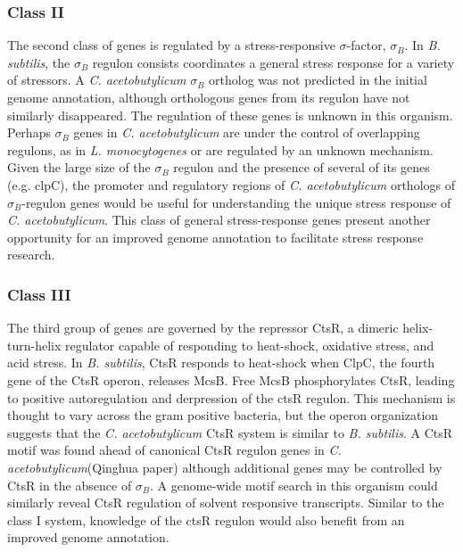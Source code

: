 \subsubsection{Class II}
The second class of genes is regulated by a stress-responsive $\sigma$-factor, $\sigma_{B}$. In \textit{B. subtilis}, the $\sigma_B$ regulon consists coordinates a general stress response for a variety of stressors. A \textit{C. acetobutylicum} $\sigma_{B}$ ortholog was not predicted in the initial genome annotation,\cite{91,42} although orthologous genes from its regulon have not similarly disappeared.\cite{132,133,134,135} The regulation of these genes is unknown in this organism. Perhaps $\sigma_{B}$ genes in \textit{C. acetobutylicum} are under the control of overlapping regulons, as in \textit{L. monocytogenes}\cite{193} or are regulated by an unknown mechanism. Given the large size of the $\sigma_{B}$ regulon and the presence of several of its genes (e.g. clpC\cite{132}), the promoter and regulatory regions of \textit{C. acetobutylicum} orthologs of $\sigma_{B}$-regulon genes would be useful for understanding the unique stress response of \textit{C. acetobutylicum}. This class of general stress-response genes present another opportunity for an improved genome annotation to facilitate stress response research.

\subsubsection{Class III}
The third group of genes are governed by the repressor CtsR, a dimeric helix-turn-helix regulator capable of responding to heat-shock, oxidative stress, and acid stress.\cite{136} In \textit{B. subtilis}, CtsR responds to heat-shock when ClpC, the fourth gene of the CtsR operon, releases McsB.\cite{140} Free McsB phosphorylates CtsR, leading to positive autoregulation and derpression of the ctsR regulon.\cite{137,138,140} This mechanism is thought to vary across the gram positive bacteria,\cite{137} but the operon organization suggests that the \textit{C. acetobutylicum} CtsR system is similar to \textit{B. subtilis}.\cite{42} A CtsR motif was found ahead of canonical CtsR regulon genes in \textit{C. acetobutylicum}(Qinghua paper) although additional genes may be controlled by CtsR in the absence of $\sigma_{B}$. A genome-wide motif search in this organism could similarly reveal CtsR regulation of solvent responsive transcripts. Similar to the class I system, knowledge of the ctsR regulon would also benefit from an improved genome annotation.

